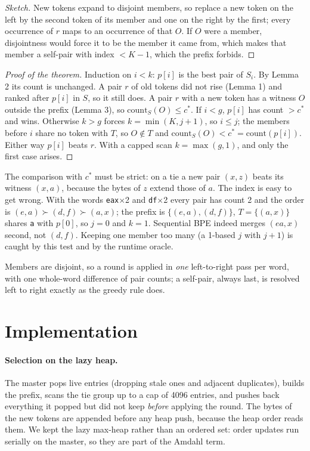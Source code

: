 \documentclass[11pt,a4paper]{article}
\newcommand{\code}[1]{\texttt{#1}}
\begin{document}
\begin{proof}[Sketch]
New tokens expand to disjoint members, so replace a new token on the left by the second token of its member and one on
the right by the first; every occurrence of $r$ maps to an occurrence of that $O$. If $O$ were a member, disjointness
would force it to be the member it came from, which makes that member a self-pair with index $<K{-}1$, which the prefix
forbids.
\end{proof}

\begin{proof}[Proof of the theorem]
Induction on $i<k$: $p[i]$ is the best pair of $S_i$. By Lemma 2 its count is unchanged. A pair $r$ of old tokens did
not rise (Lemma 1) and ranked after $p[i]$ in $S$, so it still does. A pair $r$ with a new token has a witness $O$ outside
the prefix (Lemma 3), so $\mathrm{count}_S(O)\le c^*$. If $i<g$, $p[i]$ has count $>c^*$ and wins. Otherwise $k>g$ forces
$k=\min(K,j+1)$, so $i\le j$; the members before $i$ share no token with $T$, so $O\notin T$ and
$\mathrm{count}_S(O) < c^* = \mathrm{count}(p[i])$. Either way $p[i]$ beats $r$. With a capped scan $k=\max(g,1)$, and
only the first case arises.
\end{proof}

The comparison with $c^*$ must be strict: on a tie a new pair $(x,z)$ beats its witness $(x,a)$, because the bytes of $z$
extend those of $a$. The index is easy to get wrong. With the words \code{eax}$\times$2 and \code{df}$\times$2 every pair has
count 2 and the order is $(e,a) \succ (d,f) \succ (a,x)$; the prefix is $\{(e,a),(d,f)\}$, $T=\{(a,x)\}$ shares
\code{a} with $p[0]$, so $j=0$ and $k=1$. Sequential BPE indeed merges $(ea,x)$ second, not $(d,f)$. Keeping one member
too many (a 1-based $j$ with $j+1$) is caught by this test and by the runtime oracle.

Members are disjoint, so a round is applied in \emph{one} left-to-right pass per word, with one whole-word difference of
pair counts; a self-pair, always last, is resolved left to right exactly as the greedy rule does.

\section{Implementation}

\paragraph{Selection on the lazy heap.} The master pops live entries (dropping stale ones and adjacent duplicates), builds
the prefix, scans the tie group up to a cap of 4096 entries, and pushes back everything it popped but did not keep
\emph{before} applying the round. The bytes of the new tokens are appended before any heap push, because the heap order
reads them. We kept the lazy max-heap rather than an ordered set: order updates run serially on the master, so they are
part of the Amdahl term.
\end{document}
